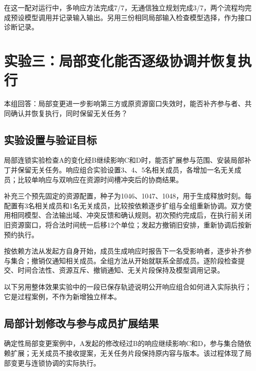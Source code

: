 在这一配对运行中，多响应方法完成7/7，无通信独立规划完成3/7，两个流程均完成预设模型调用并记录输入输出。另用三份相同局部输入检查模型选择，作为接口诊断记录。



\hypertarget{ux5c40ux90e8ux8865ux4e01ux4e0eux8fdeux9501ux534fux8c03}{%
\section{实验三：局部变化能否逐级协调并恢复执行}\label{ux5c40ux90e8ux8865ux4e01ux4e0eux8fdeux9501ux534fux8c03}}

本组回答：局部变更进一步影响第三方或原资源窗口失效时，能否补齐参与者、共同确认并恢复执行，同时保留无关任务？

\hypertarget{ux5b9eux9a8cux8bbeux7f6eux4e0eux9a8cux8bc1ux76eeux6807}{%
\subsection{实验设置与验证目标}\label{ux5b9eux9a8cux8bbeux7f6eux4e0eux9a8cux8bc1ux76eeux6807}}

局部连锁实验检查A的变化经B继续影响C和D时，能否扩展参与范围、安装局部补丁并保留无关任务。响应组合实验设置3、4、5名相关成员，各增加一名无关成员；比较单响应与双响应在资源时间槽冲突后的协商结果。

补充三个预先固定的资源配置，种子为1046、1047、1048，用于生成释放时刻。每配置有3名相关成员和1名无关成员，比较按依赖逐步扩组与全组重新协调。双方使用相同模型、合法输出域、冲突反馈和确认规则。初次预约完成后，在执行前关闭旧资源窗口，将合法时间统一后移12个单位；发起方撤销旧安排，重新协调后按新预约执行。

按依赖方法从发起方自身开始，成员生成响应时报告下一名受影响者，逐步补齐参与集合；撤销仅通知相关成员。全组方法从开始就联系全部成员。逐阶段检查提交、时间合法性、资源互斥、撤销通知、无关片段保持及模型调用记录。

以下另用整体效果实验中的一段已保存轨迹说明公开响应组合如何进入实际执行；它是过程案例，不作为新增独立样本。

\hypertarget{ux5c40ux90e8ux8865ux4e01ux4e0eux8fdeux9501ux6269ux7ec4ux7ed3ux679c}{%
\subsection{局部计划修改与参与成员扩展结果}\label{ux5c40ux90e8ux8865ux4e01ux4e0eux8fdeux9501ux6269ux7ec4ux7ed3ux679c}}

确定性局部变更案例中，A发起的修改经过B的响应继续影响C和D，参与集合随依赖扩展；无关成员不接收提案，无关任务片段保持原内容与版本。该过程体现了局部变更与连锁协调的实际执行。

